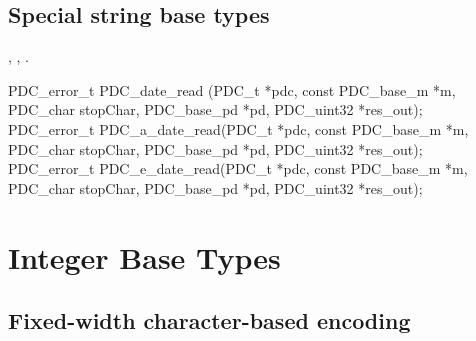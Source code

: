 \subsection{Special string base types}

\aedBegin{}
, , .
\aedEnd{}

\begin{tinycodeaux}{\leftmargin=0in}
PDC_error_t PDC_date_read  (PDC_t *pdc, const PDC_base_m *m, PDC_char stopChar,
			    PDC_base_pd *pd, PDC_uint32 *res_out);
PDC_error_t PDC_a_date_read(PDC_t *pdc, const PDC_base_m *m, PDC_char stopChar,
			    PDC_base_pd *pd, PDC_uint32 *res_out);
PDC_error_t PDC_e_date_read(PDC_t *pdc, const PDC_base_m *m, PDC_char stopChar,
			    PDC_base_pd *pd, PDC_uint32 *res_out);
\end{tinycodeaux}

\section{Integer Base Types}

\subsection{Fixed-width character-based encoding}

\aedBegin{}
\aedEnd{}

